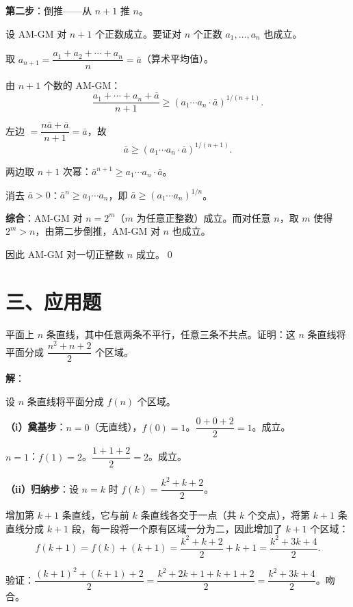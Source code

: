 \documentclass[12pt, a4paper]{ctexart}
\begin{document}
\textbf{第二步}：倒推——从 $n+1$ 推 $n$。

设 AM-GM 对 $n+1$ 个正数成立。要证对 $n$ 个正数 $a_1, \ldots, a_n$ 也成立。

取 $a_{n+1} = \dfrac{a_1 + a_2 + \cdots + a_n}{n} = \bar{a}$（算术平均值）。

由 $n+1$ 个数的 AM-GM：
\[ \frac{a_1 + \cdots + a_n + \bar{a}}{n+1} \geq (a_1 \cdots a_n \cdot \bar{a})^{1/(n+1)}. \]

左边 $= \dfrac{n\bar{a} + \bar{a}}{n+1} = \bar{a}$，故
\[ \bar{a} \geq (a_1 \cdots a_n \cdot \bar{a})^{1/(n+1)}. \]

两边取 $n+1$ 次幂：$\bar{a}^{n+1} \geq a_1 \cdots a_n \cdot \bar{a}$。

消去 $\bar{a} > 0$：$\bar{a}^n \geq a_1 \cdots a_n$，即 $\bar{a} \geq (a_1 \cdots a_n)^{1/n}$。

\textbf{综合}：AM-GM 对 $n = 2^m$（$m$ 为任意正整数）成立。而对任意 $n$，取 $m$ 使得 $2^m > n$，由第二步倒推，AM-GM 对 $n$ 也成立。

因此 AM-GM 对一切正整数 $n$ 成立。\qed

\section*{\textcolor{apppurple}{三、应用题}}

\begin{appbox}[【应用1】平面分割问题]
平面上 $n$ 条直线，其中任意两条不平行，任意三条不共点。证明：这 $n$ 条直线将平面分成 $\dfrac{n^2 + n + 2}{2}$ 个区域。
\end{appbox}

\textbf{解}：

设 $n$ 条直线将平面分成 $f(n)$ 个区域。

\textbf{（i）奠基步}：$n=0$（无直线），$f(0) = 1$。$\dfrac{0+0+2}{2} = 1$。成立。

$n=1$：$f(1) = 2$。$\dfrac{1+1+2}{2} = 2$。成立。

\textbf{（ii）归纳步}：设 $n = k$ 时 $f(k) = \dfrac{k^2 + k + 2}{2}$。

增加第 $k+1$ 条直线，它与前 $k$ 条直线各交于一点（共 $k$ 个交点），将第 $k+1$ 条直线分成 $k+1$ 段，每一段将一个原有区域一分为二，因此增加了 $k+1$ 个区域：
\[ f(k+1) = f(k) + (k+1) = \frac{k^2 + k + 2}{2} + k + 1 = \frac{k^2 + 3k + 4}{2}. \]

验证：$\dfrac{(k+1)^2 + (k+1) + 2}{2} = \dfrac{k^2 + 2k + 1 + k + 1 + 2}{2} = \dfrac{k^2 + 3k + 4}{2}$。吻合。
\end{document}
